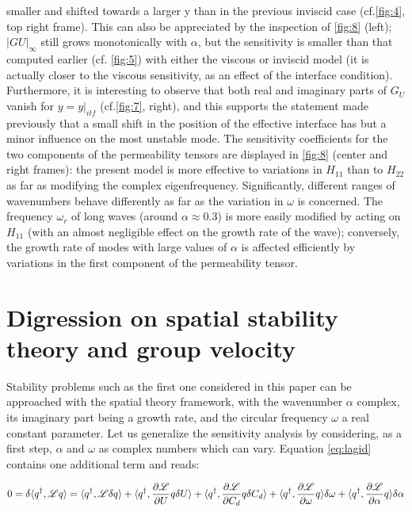 smaller and shifted towards a larger y than in the previous inviscid case (cf.\ref{fig:4}, top right frame).
This can also be appreciated by the inspection of \ref{fig:8} (left); $|G U |_{\infty}$ still grows monotonically with
$\alpha$, but the sensitivity is smaller than that computed earlier (cf. \ref{fig:5}) with either the viscous or
inviscid model (it is actually closer to the viscous sensitivity, as an effect of the interface condition).
Furthermore, it is interesting to observe that both real and imaginary parts of $G_U$ vanish for $y = y|_{itf}$
(cf.\ref{fig:7}, right), and this supports the statement made previously that a small shift in the position
of the effective interface has but a minor influence on the most unstable mode.
The sensitivity coefficients for the two components of the permeability tensors are displayed in
\ref{fig:8} (center and right frames): the present model is more effective to variations in $ {H}_{11}$ than to $ {H}_{22}$
as far as modifying the complex eigenfrequency. Significantly, different ranges of wavenumbers
behave differently as far as the variation in $\omega$ is concerned. The frequency $\omega_r$ of long waves (around
$\alpha \approx 0.3$) is more easily modified by acting on $ {H}_{11}$ (with an almost negligible effect on the growth
rate of the wave); conversely, the growth rate of modes with large values of $\alpha$ is affected efficiently
by variations in the first component of the permeability tensor.


\section*{Digression on spatial stability theory and group velocity}
\label{appB}

Stability problems such as the first one considered in this paper can be approached with the
spatial theory framework, with the wavenumber $\alpha$ complex, its imaginary part being a growth rate,
and the circular frequency $\omega$ a real constant parameter. Let us generalize the sensitivity analysis by
considering, as a first step, $\alpha$ and $\omega$ as complex numbers which can vary. Equation \ref{eq:lagid} contains one
additional term and reads:

\begin{equation}
0 = \delta \langle q^{\dagger}, \mathscr{L} q \rangle = 
\langle q^{\dagger}, \mathscr{L} \delta q \rangle +
\langle q^{\dagger}, \dfrac{\partial \mathscr{L}}{\partial U}  q \delta U\rangle +
\langle q^{\dagger}, \dfrac{\partial \mathscr{L}}{\partial C_d}  q \delta C_d\rangle +
\langle q^{\dagger}, \dfrac{\partial \mathscr{L}}{\partial \omega}  q \rangle \delta \omega +
\langle q^{\dagger}, \dfrac{\partial \mathscr{L}}{\partial \alpha}  q \rangle \delta \alpha
\label{eq:lagid_spatial}
\end{equation}

